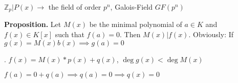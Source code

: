 $\mathbb{Z}_p|P(x) \rightarrow$ the field of order $p^n$, Galois-Field $GF(p^n)$

\textbf{Proposition.}
Let $M(x)$ be the minimal polynomial of $a \in K$ and $f(x) \in K[x]$ such that $f(a) = 0$. Then $M(x)|f(x)$. Obviously: If $g(x) = M(x)b(x) \implies g(a) = 0$

\Proof. 
$f(x) = M(x) * p(x) + q(x)$, $\deg g(x) < \deg M(x)$

$f(a) = 0 + q(a) \implies q(a) = 0 \implies q(x) = 0$







